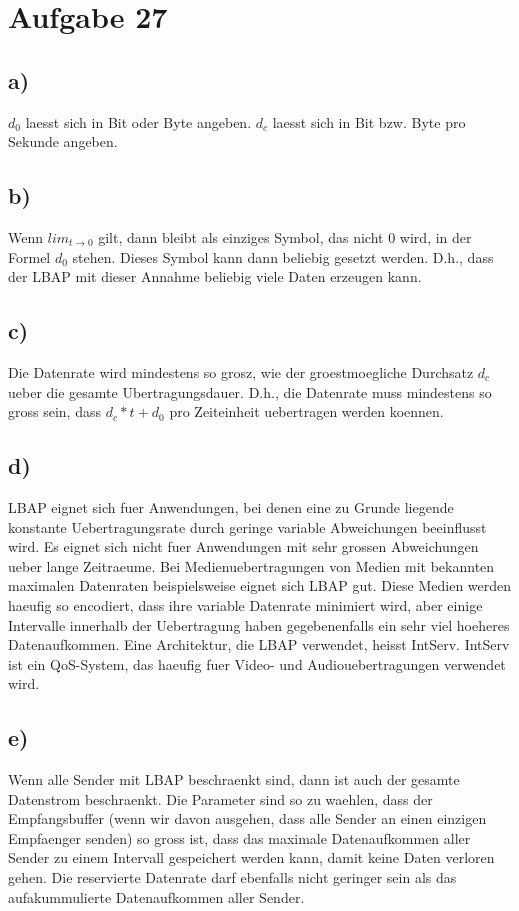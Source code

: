 \documentclass[a4paper,12pt]{scrartcl}
\begin{document}
\section{Aufgabe 27}
\subsection{a)}
\(d_0\) laesst sich in Bit oder Byte angeben. \(d_c\) laesst sich in Bit bzw. Byte pro Sekunde
angeben.

\subsection{b)}
Wenn \(lim_{t \to 0}\) gilt, dann bleibt als einziges Symbol, das nicht 0 wird, in der Formel
\(d_0\) stehen. Dieses Symbol kann dann beliebig gesetzt werden. D.h., dass der LBAP mit dieser
Annahme beliebig viele Daten erzeugen kann.

\subsection{c)}
Die Datenrate wird mindestens so grosz, wie der groestmoegliche Durchsatz \(d_c\) ueber die gesamte
Ubertragungsdauer. D.h., die Datenrate muss mindestens so gross sein, dass \(d_c * t + d_0\) pro
Zeiteinheit uebertragen werden koennen.

\subsection{d)}
LBAP eignet sich fuer Anwendungen, bei denen eine zu Grunde liegende konstante Uebertragungsrate
durch geringe variable Abweichungen beeinflusst wird. Es eignet sich nicht fuer Anwendungen mit
sehr grossen Abweichungen ueber lange Zeitraeume. Bei Medienuebertragungen von Medien mit bekannten
maximalen Datenraten beispielsweise eignet sich LBAP gut. Diese Medien werden haeufig so encodiert,
dass ihre variable Datenrate minimiert wird, aber einige Intervalle innerhalb der Uebertragung
haben gegebenenfalls ein sehr viel hoeheres Datenaufkommen. Eine Architektur, die LBAP verwendet,
heisst IntServ. IntServ ist ein QoS-System, das haeufig fuer Video- und Audiouebertragungen
verwendet wird.

\subsection{e)}
Wenn alle Sender mit LBAP beschraenkt sind, dann ist auch der gesamte Datenstrom beschraenkt. Die
Parameter sind so zu waehlen, dass der Empfangsbuffer (wenn wir davon ausgehen, dass alle Sender an
einen einzigen Empfaenger senden) so gross ist, dass das maximale Datenaufkommen aller Sender zu
einem Intervall gespeichert werden kann, damit keine Daten verloren gehen. Die reservierte
Datenrate darf ebenfalls nicht geringer sein als das aufakummulierte Datenaufkommen aller Sender.
\end{document}
